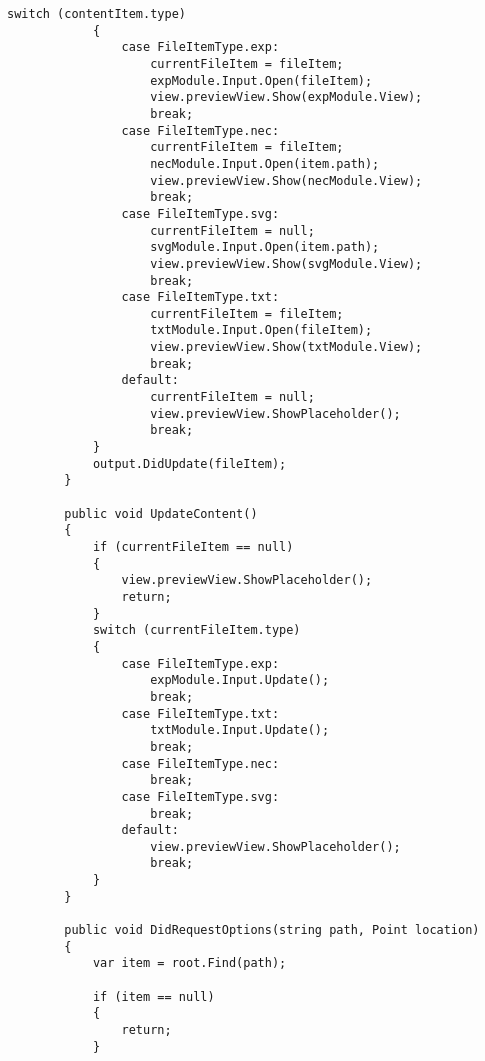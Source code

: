 \documentclass{scrartcl}
\begin{document}
\begin{lstlisting}[language={[Sharp]C}, caption={IDE}, label={experiment}]
            switch (contentItem.type)
            {
                case FileItemType.exp:
                    currentFileItem = fileItem;
                    expModule.Input.Open(fileItem);
                    view.previewView.Show(expModule.View);
                    break;
                case FileItemType.nec:
                    currentFileItem = fileItem;
                    necModule.Input.Open(item.path);
                    view.previewView.Show(necModule.View);
                    break;
                case FileItemType.svg:
                    currentFileItem = null;
                    svgModule.Input.Open(item.path);
                    view.previewView.Show(svgModule.View);
                    break;
                case FileItemType.txt:
                    currentFileItem = fileItem;
                    txtModule.Input.Open(fileItem);
                    view.previewView.Show(txtModule.View);
                    break;
                default:
                    currentFileItem = null;
                    view.previewView.ShowPlaceholder();
                    break;
            }
            output.DidUpdate(fileItem);
        }

        public void UpdateContent()
        {
            if (currentFileItem == null)
            {
                view.previewView.ShowPlaceholder();
                return;
            }
            switch (currentFileItem.type)
            {
                case FileItemType.exp:
                    expModule.Input.Update();
                    break;
                case FileItemType.txt:
                    txtModule.Input.Update();
                    break;
                case FileItemType.nec:
                    break;
                case FileItemType.svg:
                    break;
                default:
                    view.previewView.ShowPlaceholder();
                    break;
            }
        }

        public void DidRequestOptions(string path, Point location)
        {
            var item = root.Find(path);

            if (item == null)
            {
                return;
            }


\end{lstlisting}
\end{document}
